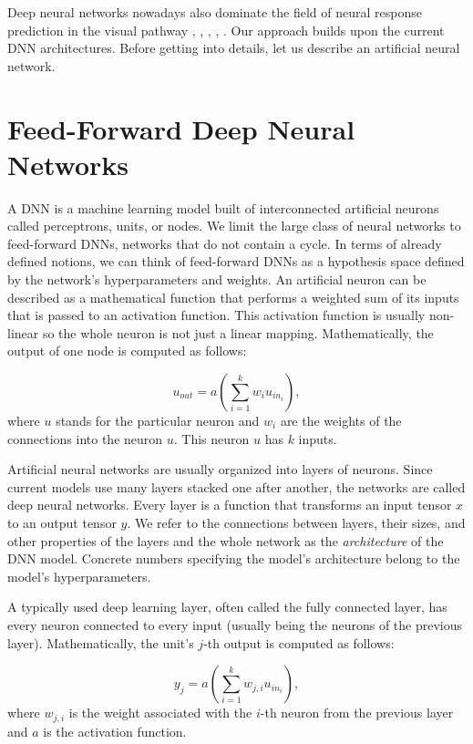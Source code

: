 Deep neural networks nowadays also dominate the field of neural response prediction in the visual pathway \citep{klindt2017neural}, \citep{lurz2021generalization}, \citep{ecker2018rotation}, \citep{butts2019data}, \citep{sinz2018stimulus}. Our approach builds upon the current DNN architectures. Before getting into details, let us describe an artificial neural network.

\section{Feed-Forward Deep Neural Networks}

A DNN is a machine learning model built of interconnected artificial neurons called perceptrons, units, or nodes. We limit the large class of neural networks to feed-forward DNNs, networks that do not contain a cycle. In terms of already defined notions, we can think of feed-forward DNNs as a hypothesis space defined by the network’s hyperparameters and weights. An artificial neuron can be described as a mathematical function that performs a weighted sum of its inputs that is passed to an activation function. This activation function is usually non-linear so the whole neuron is not just a linear mapping. Mathematically, the output of one node is computed as follows: 

\begin{equation}
u_{out} = a \left( \sum_{i=1}^k w_i u_{in_i} \right),
\end{equation}
where $u$ stands for the particular neuron and $w_i$ are the weights of the connections into the neuron $u$. This neuron $u$ has $k$ inputs.

Artificial neural networks are usually organized into layers of neurons. Since current models use many layers stacked one after another, the networks are called deep neural networks. Every layer is a function that transforms an input tensor $x$ to an output tensor $y$. We refer to the connections between layers, their sizes, and other properties of the layers and the whole network as the \emph{architecture} of the DNN model. Concrete numbers specifying the model’s architecture belong to the model’s hyperparameters. 

A typically used deep learning layer, often called the fully connected layer, has every neuron connected to every input (usually being the neurons of the previous layer). Mathematically, the unit’s $j$-th output is computed as follows: 

\begin{equation}
y_j = a\left(\sum_{i=1}^k w_{j,i} u_{in_i}\right),
\end{equation}
where $w_{j,i}$ is the weight associated with the $i$-th neuron from the previous layer and $a$ is the activation function.

